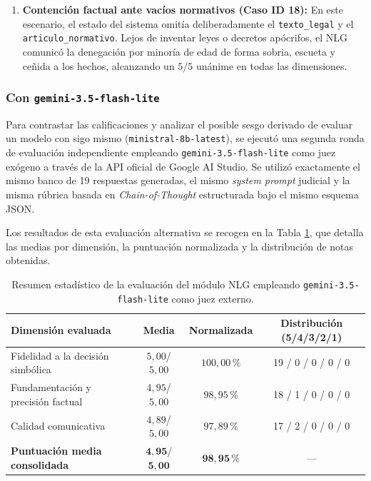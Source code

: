 \documentclass[12pt,a4paper]{report}
\begin{document}
\begin{enumerate}
    \item \textbf{Contención factual ante vacíos normativos (Caso ID 18):} En este escenario, el estado del sistema omitía deliberadamente el \texttt{texto\_legal} y el \texttt{articulo\_normativo}. Lejos de inventar leyes o decretos apócrifos, el NLG comunicó la denegación por minoría de edad de forma sobria, escueta y ceñida a los hechos, alcanzando un $5/5$ unánime en todas las dimensiones.
\end{enumerate}

\subsubsection{Con \texttt{gemini-3.5-flash-lite}}

Para contrastar las calificaciones y analizar el posible sesgo derivado de evaluar un modelo con sigo mismo (\texttt{ministral-8b-latest}), se ejecutó una segunda ronda de evaluación independiente empleando \texttt{gemini-3.5-flash-lite} como juez exógeno a través de la API oficial de Google AI Studio. Se utilizó exactamente el mismo banco de 19 respuestas generadas, el mismo \textit{system prompt} judicial y la misma rúbrica basada en \textit{Chain-of-Thought} estructurada bajo el mismo esquema JSON.

Los resultados de esta evaluación alternativa se recogen en la Tabla \ref{tab:nlg_gemini_summary}, que detalla las medias por dimensión, la puntuación normalizada y la distribución de notas obtenidas.

\begin{table}[H]
\centering
\footnotesize
\setlength{\tabcolsep}{4pt}
\label{tab:nlg_gemini_summary}
\begin{tabularx}{\textwidth}{@{}>{\raggedright\arraybackslash}X c c c@{}}
\toprule
\textbf{Dimensión evaluada} & \textbf{Media} & \textbf{Normalizada} & \textbf{Distribución (5/4/3/2/1)} \\
\midrule
Fidelidad a la decisión simbólica & $5{,}00$/$5{,}00$ & $100{,}00\,$\% & 19 / 0 / 0 / 0 / 0 \\
Fundamentación y precisión factual & $4{,}95$/$5{,}00$ & $98{,}95\,$\% & 18 / 1 / 0 / 0 / 0 \\
Calidad comunicativa & $4{,}89$/$5{,}00$ & $97{,}89\,$\% & 17 / 2 / 0 / 0 / 0 \\
\midrule
\textbf{Puntuación media consolidada} & $\mathbf{4{,}95}$/$\mathbf{5{,}00}$ & $\mathbf{98{,}95\,}$\% & --- \\
\bottomrule
\end{tabularx}
\caption{Resumen estadístico de la evaluación del módulo NLG empleando \texttt{gemini-3.5-flash-lite} como juez externo.}
\end{table}
\end{document}
